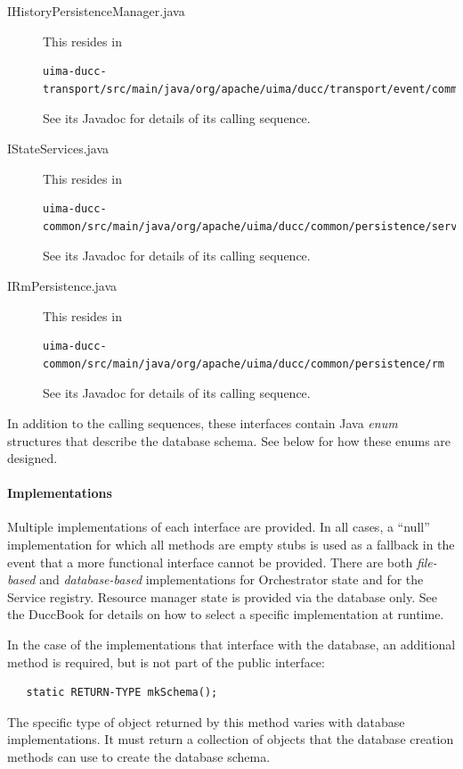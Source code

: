     \begin{description}
      \item[IHistoryPersistenceManager.java] This resides in 
\begin{verbatim}
uima-ducc-transport/src/main/java/org/apache/uima/ducc/transport/event/common/history
\end{verbatim}
        See its Javadoc for details of its calling sequence.
      \item[IStateServices.java] This resides in
\begin{verbatim}
uima-ducc-common/src/main/java/org/apache/uima/ducc/common/persistence/services
\end{verbatim}
      See its Javadoc for details of its calling sequence.   
      \item[IRmPersistence.java] This resides in 
\begin{verbatim}
uima-ducc-common/src/main/java/org/apache/uima/ducc/common/persistence/rm
\end{verbatim}
      See its Javadoc for details of its calling sequence.
    \end{description}

    In addition to the calling sequences, these interfaces contain Java {\em enum} structures that
    describe the database schema.  See below for how these enums are designed.

    \paragraph{Implementations}
    Multiple implementations of each interface are provided.  In all cases, a ``null''
    implementation for which all methods are empty stubs is used as a fallback in the event that a
    more functional interface cannot be provided.  There are both {\em file-based} and {\em
      database-based} implementations for Orchestrator state and for the Service registry.  Resource
    manager state is provided via the database only.  See the DuccBook for details on how to select
    a specific implementation at runtime.

    In the case of the implementations that interface with the database, an additional method is
    required, but is not part of the public interface:
\begin{verbatim}
   static RETURN-TYPE mkSchema();
\end{verbatim}
    The specific type of object returned by this method varies with database implementations.  It
    must return a collection of objects that the database creation methods can use to create the
    database schema.
    
